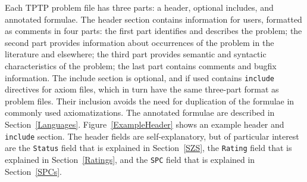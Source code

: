 \documentclass{easychair}
\begin{document}
Each TPTP problem file has three parts: a header, optional includes, and annotated formulae.
The header section contains information for users, formatted as comments in four parts:
the first part identifies and describes the problem;
the second part provides information about occurrences of the problem
in the literature and elsewhere;
the third part provides semantic and syntactic characteristics of the problem;
the last part contains comments and bugfix information.
The include section is optional, and if used contains {\tt include} directives for axiom files,
which in turn have the same three-part format as problem files.
Their inclusion avoids the need for duplication of the formulae in commonly used axiomatizations.
The annotated formulae are described in Section~\ref{Languages}.
Figure~\ref{ExampleHeader} shows an example header and {\tt include} section.
The header fields are self-explanatory, but of particular interest are the {\tt Status} field 
that is explained in Section~\ref{SZS}, the {\tt Rating} field that is explained in 
Section~\ref{Ratings}, and the {\tt SPC} field that is explained in Section~\ref{SPCs}.
\end{document}
